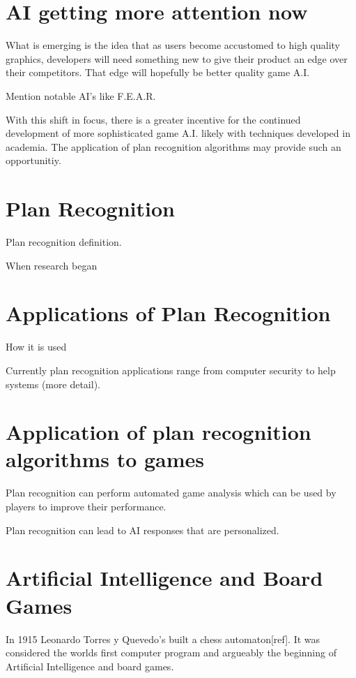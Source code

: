 \documentclass[parskip]{cs4rep}
\begin{document}
\section{AI getting more attention now}

What is emerging is the idea that as users become accustomed to high quality graphics, developers will need something new to give their product an edge over their competitors. That edge will hopefully be better quality game A.I.

Mention notable AI's like F.E.A.R.

With this shift in focus, there is a greater incentive for the continued development of more sophisticated game A.I. likely with techniques developed in academia. The application of plan recognition algorithms may provide such an opportunitiy. 

\section{Plan Recognition}

Plan recognition definition.

When research began

\section{Applications of Plan Recognition}

How it is used

Currently plan recognition applications range from computer security to help systems (more detail).

\section{Application of plan recognition algorithms to games}

Plan recognition can perform automated game analysis which can be used by players to improve their performance. 

Plan recognition can lead to AI responses that are personalized.

\section{Artificial Intelligence and Board Games}

In 1915 Leonardo Torres y Quevedo's built a chess automaton[ref]. It was considered the worlds first computer program and argueably the beginning of Artificial Intelligence and board games.
\end{document}
